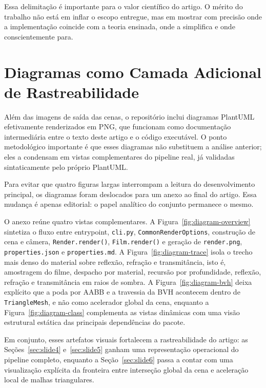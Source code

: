 \documentclass[portuguese]{sbcreviews-2025}%
\begin{document}
Essa delimitação é importante para o valor científico do artigo. O mérito do trabalho não está em inflar o escopo entregue, mas em mostrar com precisão onde a implementação coincide com a teoria ensinada, onde a simplifica e onde conscientemente para.

\section{Diagramas como Camada Adicional de Rastreabilidade}
\label{sec:experimentos-diagramas}

Além das imagens de saída das cenas, o repositório inclui diagramas PlantUML efetivamente renderizados em PNG, que funcionam como documentação intermediária entre o texto deste artigo e o código executável. O ponto metodológico importante é que esses diagramas não substituem a análise anterior; eles a condensam em vistas complementares do pipeline real, já validadas sintaticamente pelo próprio PlantUML.

Para evitar que quatro figuras largas interrompam a leitura do desenvolvimento principal, os diagramas foram deslocados para um anexo ao final do artigo. Essa mudança é apenas editorial: o papel analítico do conjunto permanece o mesmo.

O anexo reúne quatro vistas complementares. A Figura~\ref{fig:diagram-overview} sintetiza o fluxo entre entrypoint, \texttt{cli.py}, \texttt{CommonRenderOptions}, construção de cena e câmera, \texttt{Render.render()}, \texttt{Film.render()} e geração de \texttt{render.png}, \texttt{properties.json} e \texttt{properties.md}. A Figura~\ref{fig:diagram-trace} isola o trecho mais denso do material sobre reflexão, refração e transmitância, isto é, amostragem do filme, despacho por material, recursão por profundidade, reflexão, refração e transmitância em raios de sombra. A Figura~\ref{fig:diagram-bvh} deixa explícito que a poda por AABB e a travessia da BVH acontecem dentro de \texttt{TriangleMesh}, e não como acelerador global da cena, enquanto a Figura~\ref{fig:diagram-class} complementa as vistas dinâmicas com uma visão estrutural estática das principais dependências do pacote.

Em conjunto, esses artefatos visuais fortalecem a rastreabilidade do artigo: as Seções~\ref{sec:slide4} e~\ref{sec:slide5} ganham uma representação operacional do pipeline completo, enquanto a Seção~\ref{sec:slide6} passa a contar com uma visualização explícita da fronteira entre interseção global da cena e aceleração local de malhas triangulares.
\end{document}
